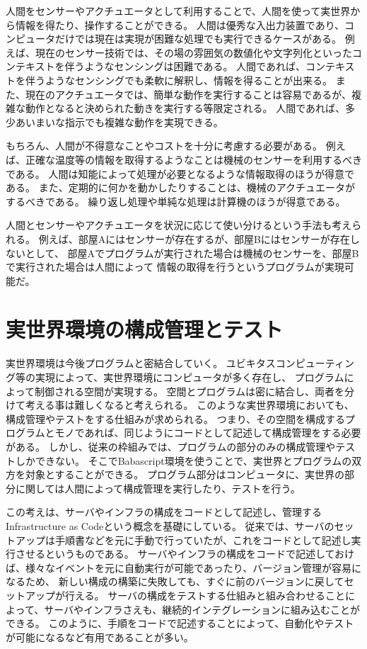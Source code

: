 人間をセンサーやアクチュエータとして利用することで、人間を使って実世界から情報を得たり、操作することができる。
人間は優秀な入出力装置であり、コンピュータだけでは現在は実現が困難な処理でも実行できるケースがある。
例えば、現在のセンサー技術では、その場の雰囲気の数値化や文字列化といったコンテキストを伴うようなセンシングは困難である。
人間であれば、コンテキストを伴うようなセンシングでも柔軟に解釈し、情報を得ることが出来る。
また、現在のアクチュエータでは、簡単な動作を実行することは容易であるが、複雑な動作となると決められた動きを実行する等限定される。
人間であれば、多少あいまいな指示でも複雑な動作を実現できる。

もちろん、人間が不得意なことやコストを十分に考慮する必要がある。
例えば、正確な温度等の情報を取得するようなことは機械のセンサーを利用するべきである。
人間は知能によって処理が必要となるような情報取得のほうが得意である。
また、定期的に何かを動かしたりすることは、機械のアクチュエータがするべきである。
繰り返し処理や単純な処理は計算機のほうが得意である。

人間とセンサーやアクチュエータを状況に応じて使い分けるという手法も考えられる。
例えば、部屋Aにはセンサーが存在するが、部屋Bにはセンサーが存在しないとして、
部屋Aでプログラムが実行された場合は機械のセンサーを、部屋Bで実行された場合は人間によって
情報の取得を行うというプログラムが実現可能だ。

\section{実世界環境の構成管理とテスト}\label{ux5b9fux4e16ux754cux74b0ux5883ux306eux69cbux6210ux7ba1ux7406ux3068ux30c6ux30b9ux30c8}

実世界環境は今後プログラムと密結合していく。
ユビキタスコンピューティング等の実現によって、実世界環境にコンピュータが多く存在し、
プログラムによって制御される空間が実現する。
空間とプログラムは密に結合し、両者を分けて考える事は難しくなると考えられる。
このような実世界環境においても、構成管理やテストをする仕組みが求められる。
つまり、その空間を構成するプログラムとモノであれば、同じようにコードとして記述して構成管理をする必要がある。
しかし、従来の枠組みでは、プログラムの部分のみの構成管理やテストしかできない。
そこでBabascript環境を使うことで、実世界とプログラムの双方を対象とすることができる。
プログラム部分はコンピュータに、実世界の部分に関しては人間によって構成管理を実行したり、テストを行う。

この考えは、サーバやインフラの構成をコードとして記述し、管理するInfrastructure
as Codeという概念を基礎にしている。
従来では、サーバのセットアップは手順書などを元に手動で行っていたが、これをコードとして記述し実行させるというものである。
サーバやインフラの構成をコードで記述しておけば、様々なイベントを元に自動実行が可能であったり、バージョン管理が容易になるため、
新しい構成の構築に失敗しても、すぐに前のバージョンに戻してセットアップが行える。
サーバの構成をテストする仕組みと組み合わせることによって、サーバやインフラさえも、継続的インテグレーションに組み込むことができる。
このように、手順をコードで記述することによって、自動化やテストが可能になるなど有用であることが多い。

